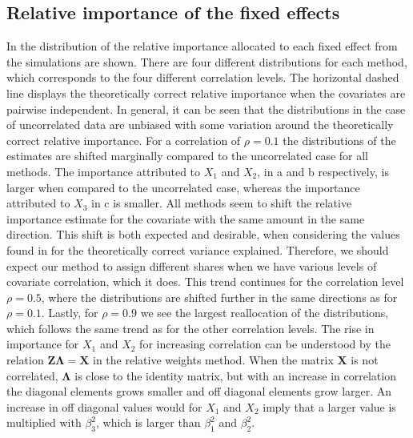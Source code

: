 \subsection{Relative importance of the fixed effects}
\label{sec:relimp_fixed}
In  the distribution of the relative importance allocated to each fixed effect from the simulations are shown.
There are four different distributions for each method, which corresponds to the four different correlation levels. 
The horizontal dashed line displays the theoretically correct relative importance when the covariates are pairwise independent. 
\newline
\newline
In general, it can be seen that the distributions in the case of uncorrelated data are unbiased with some variation around the theoretically correct relative importance.
For a correlation of $\rho=0.1$ the distributions of the estimates are shifted marginally compared to the uncorrelated case for all methods.
The importance attributed to $X_1$ and $X_2$, in a and b respectively, is larger when compared to the uncorrelated case, whereas the importance attributed to $X_3$ in c is smaller.
All methods seem to shift the relative importance estimate for the covariate with the same amount in the same direction.
This shift is both expected and desirable, when considering the values found in  for the theoretically correct variance explained. 
Therefore, we should expect our method to assign different shares when we have various levels of covariate correlation, which it does.
This trend continues for the correlation level $\rho=0.5$, where the distributions are shifted further in the same directions as for $\rho=0.1$.
Lastly, for $\rho=0.9$ we see the largest reallocation of the distributions, which follows the same trend as for the other correlation levels.
\newline
\newline
The rise in importance for $X_1$ and $X_2$ for increasing correlation can be understood by the relation $\mathbf{Z}\boldsymbol{\Lambda}=\mathbf{X}$ in the relative weights method. 
When the matrix $\mathbf{X}$ is not correlated, $\boldsymbol{\Lambda}$ is close to the identity matrix, but with an increase in correlation the diagonal elements grows smaller and off diagonal elements grow larger.
An increase in off diagonal values would for $X_1$ and $X_2$ imply that a larger value is multiplied with $\beta_3^2$, which is larger than $\beta_1^2$ and $\beta_2^2$. 
